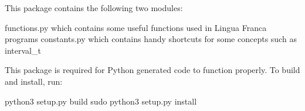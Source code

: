This package contains the following two modules\+:

functions.\+py which contains some useful functions used in Lingua Franca programs constants.\+py which contains handy shortcuts for some concepts such as \textquotesingle{}interval\+\_\+t\textquotesingle{}

This package is required for Python generated code to function properly. To build and install, run\+: \begin{DoxyVerb}python3 setup.py build
sudo python3 setup.py install
\end{DoxyVerb}
 
